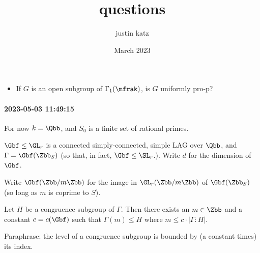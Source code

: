 \documentclass{book}
\title{questions}
\author{justin katz}
\date{March 2023}
\begin{document}
\begin{itemize}
  \item If $G$ is an open subgroup of $\Gamma_1(\mfrak)$, is $G$ uniformly pro-p?
\end{itemize}

\paragraph*{2023-05-03 11:49:15}
For now $k=\Qbb$, and $S_0$ is a finite set of rational primes.

$\Gbf\leq \GL_r$ is a connected simply-connected, simple LAG over $\Qbb$, and $\Gamma = \Gbf(\Zbb_S)$ (so that, in fact, $\Gbf \leq \SL_r$.). Write $d$ for the dimension of $\Gbf$.

Write $\Gbf(\Zbb/m\Zbb)$ for the image in $\GL_r(\Zbb/m\Zbb)$ of $\Gbf(\Zbb_S)$ (so long as $m$ is coprime to $S$).

\begin{proposition}
  Let $H$ be a congruence subgroup of $\Gamma$. Then there exists an $m \in \Zbb$ and a constant $c=c(\Gbf)$ such that $\Gamma(m)\leq H$ where $m \leq c \cdot |\Gamma:H|$.

  Paraphrase: the level of a congruence subgroup is bounded by (a constant times) its index.
\end{proposition}


% 
\end{document}
